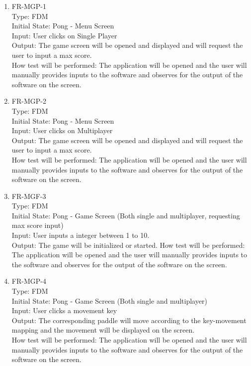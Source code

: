 \documentclass[12pt, titlepage]{article}
\begin{document}
\begin{enumerate}

\item{FR-MGP-1\\}
Type: FDM\\
Initial State: Pong - Menu Screen\\
Input: User clicks on Single Player\\
Output: The game screen will be opened and displayed and will request the user to input a max score.\\
How test will be performed: The application will be opened and the user will manually provides inputs to the software and observes for the output of the software on the screen.\\

\item{FR-MGP-2\\}
Type: FDM\\
Initial State: Pong - Menu Screen\\
Input: User clicks on Multiplayer\\
Output: The game screen will be opened and displayed and will request the user to input a max score.\\
How test will be performed: The application will be opened and the user will manually provides inputs to the software and observes for the output of the software on the screen.\\

\item{FR-MGF-3\\}
Type: FDM\\
Initial State: Pong - Game Screen (Both single and multiplayer, requesting max score input)\\
Input: User inputs a integer between 1 to 10.\\
Output: The game will be initialized or started.
How test will be performed: The application will be opened and the user will manually provides inputs to the software and observes for the output of the software on the screen.\\

\item{FR-MGP-4\\}
Type: FDM\\
Initial State: Pong - Game Screen (Both single and multiplayer)\\
Input: User clicks a movement key\\
Output: The corresponding paddle will move according to the key-movement mapping and the movement will be displayed on the screen.\\
How test will be performed: The application will be opened and the user will manually provides inputs to the software and observes for the output of the software on the screen.\\


\end{enumerate}
\end{document}
